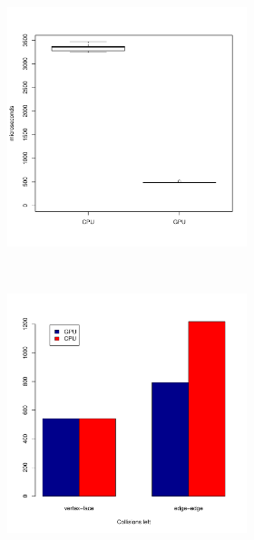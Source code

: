 \begin{figure}
		\begin{subfigure}[b]{0.45\textwidth}
			\begin{subfigure}[b]{0.45\textwidth}
				\includegraphics[width=\textwidth]{results/time/lucy_5000}
			\end{subfigure}
			~%
			\begin{subfigure}[b]{0.45\textwidth}
				\includegraphics[width=\textwidth]{results/correctness/lucy_5000}

\end{subfigure}
\end{subfigure}
\end{figure}
